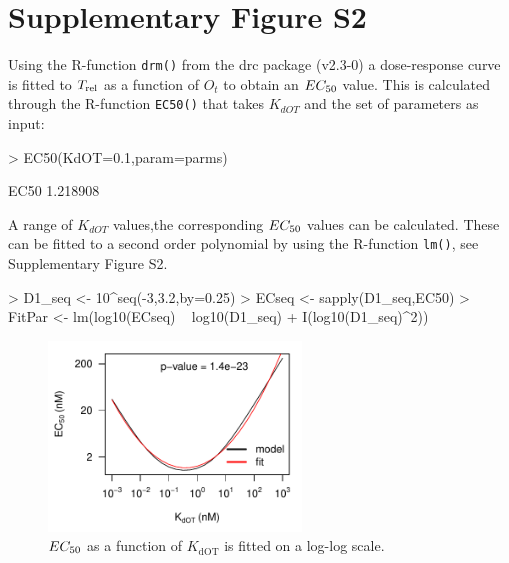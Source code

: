\documentclass[a4paper,11pt]{article}
\newenvironment{Ncenter}{%
  \setlength\topsep{-10pt}
  \setlength\parskip{-100pt}
  \begin{center}
}{%
  \end{center}
}
\newcommand{\Trel}{T_{\rm{rel}}}
\newcommand{\EC}{EC_{\rm{50}}}
\newcommand{\kdOT}{K_{\mathrm{dOT}}}
\begin{document}
\section{Supplementary Figure S2}
Using the R-function \texttt{drm()} from the drc package (v2.3-0) a dose-response curve is fitted to $\Trel$ as a function of $O_t$ to obtain an $\EC$ value. This is calculated through the R-function \texttt{EC50()} that takes $K_{dOT}$ and the set of parameters as input:
\begin{Schunk}
\begin{Sinput}
> EC50(KdOT=0.1,param=parms)
\end{Sinput}
\begin{Soutput}
    EC50 
1.218908 
\end{Soutput}
\end{Schunk}
A range of $K_{dOT}$ values,the corresponding $\EC$ values can be calculated. These can be fitted to a second order polynomial by using the R-function \texttt{lm()}, see Supplementary Figure S2. 
\begin{Schunk}
\begin{Sinput}
> D1_seq <- 10^seq(-3,3.2,by=0.25)
> ECseq <- sapply(D1_seq,EC50)
> FitPar <- lm(log10(ECseq) ~ log10(D1_seq) + I(log10(D1_seq)^2))
\end{Sinput}
\end{Schunk}
\begin{figure}[!h]
\begin{Ncenter}
\includegraphics[width=0.6\textwidth]{SuppFile1-S31.pdf}
\end{Ncenter}
\caption{$\EC$ as a function of $\kdOT$ is fitted on a log-log scale.}\label{fig::Opt}
\end{figure}


\end{document}
